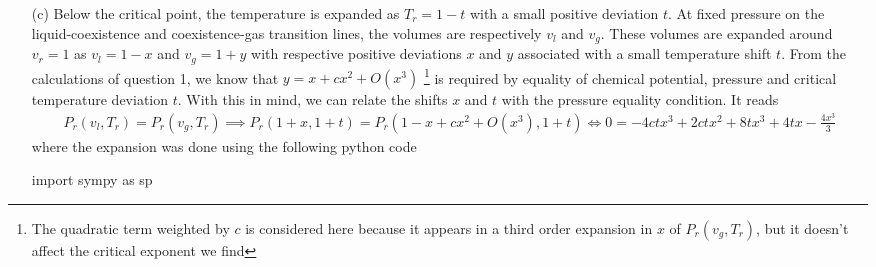 \documentclass[10pt, a4paper]{article}
\begin{document}
{\begin{enumerate}
\begin{python}
vr, x = sp.symbols("vr x")

P = sp.exp(2-2/vr)/(2*vr - 1)
P = P.subs({vr:1+x}).series(x, 0, 4)
  \end{python}
  Using the previous expansion, we can solve for $x$ as a function of $P_r$ leading to 
  \begin{align*}
    x = v_r-1 = -\frac{3}{2}\left(P_r - 1\right)^{1/3} \sim \left(P_r - 1\right)^{1/\delta}
  \end{align*}
  leading to the critical same critical exponent $\delta = 3$ as in the Van der Waals model. We this result to extract the $\gamma$ critical exponent describing the scaling of isothermal compressibility $k_T$ at $T_r = 1$ as a function of $P_r$. We have 
  \begin{align*}
    k_T = -\dfrac{1}{v_r}\left(\frac{\partial v_r}{\partial P_r}\right) \approx \frac{-\frac{3}{6}\left(P_r - 1\right)^{-2/3}}{-\frac{3}{2}\left(P_r - 1\right)^{1/3}} = -\frac{-\frac{3}{6}\left(P_r - 1\right)^{-2/3}}{-\frac{3}{2}\left(P_r - 1\right)^{1/3}} = -\frac{1}{3} \left(P_r - 1\right)^{-1} \sim (P_r - 1)^{-\gamma}
  \end{align*}
  which is consistent with $\gamma = 1$. 


  \item[(c)] Below the critical point, the temperature is expanded as $T_r = 1 - t$ with a small positive deviation $t$. At fixed pressure on the liquid-coexistence and coexistence-gas transition lines, the volumes are respectively $v_l$ and $v_g$. These volumes are expanded around $v_r = 1$ as $v_l = 1 - x$ and $v_g = 1 + y$ with respective positive deviations $x$ and $y$ associated with a small temperature shift $t$. From the calculations of question 1, we know that $y = x + c x^2 + O(x^3)$ \footnote{The quadratic term weighted by $c$ is considered here because it appears in a third order expansion in $x$ of $P_r(v_g, T_r)$, but it doesn't affect the critical exponent we find} is required by equality of chemical potential, pressure and critical temperature deviation $t$. With this in mind, we can relate the shifts $x$ and $t$ with the pressure equality condition. It reads  
  \begin{align*}
    P_r(v_l, T_r) = P_r(v_g, T_r) \implies  P_r(1+x, 1+t) = P_r(1-x + cx^2 + O(x^3), 1+t)
    \iff 0 = - 4 c t x^{3} + 2 c t x^{2} + 8 t x^{3} + 4 t x - \frac{4 x^{3}}{3}
  \end{align*} 
where the expansion was done using the following python code
\begin{python}
import sympy as sp 


\end{python}
\end{enumerate}}
\end{document}
